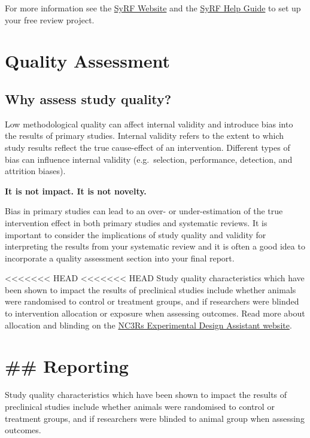 \documentclass[
]{book}
\begin{document}
For more information see the \href{http://syrf.org.uk/}{SyRF Website} and the \href{https://assets.syrf.org.uk/guides/SyRF_User_Guide.pdf}{SyRF Help Guide} to set up your free review project.

\hypertarget{quality-assessment}{%
\chapter{Quality Assessment}\label{quality-assessment}}

\hypertarget{why-assess-study-quality}{%
\section{Why assess study quality?}\label{why-assess-study-quality}}

Low methodological quality can affect internal validity and introduce bias into the results of primary studies. Internal validity refers to the extent to which study results reflect the true cause-effect of an intervention. Different types of bias can influence internal validity (e.g.~selection, performance, detection, and attrition biases).

\textbf{It is not impact. It is not novelty.}

Bias in primary studies can lead to an over- or under-estimation of the true intervention effect in both primary studies and systematic reviews. It is important to consider the implications of study quality and validity for interpreting the results from your systematic review and it is often a good idea to incorporate a quality assessment section into your final report.

\textless\textless\textless\textless\textless\textless\textless{} HEAD
\textless\textless\textless\textless\textless\textless\textless{} HEAD
Study quality characteristics which have been shown to impact the results of preclinical studies include whether animals were randomised to control or treatment groups, and if researchers were blinded to intervention allocation or exposure when assessing outcomes.
Read more about allocation and blinding on the \href{https://eda.nc3rs.org.uk/experimental-design-allocation}{NC3Rs Experimental Design Assistant website}.

\hypertarget{reporting}{%
\chapter{\#\# Reporting}\label{reporting}}

Study quality characteristics which have been shown to impact the results of preclinical studies include whether animals were randomised to control or treatment groups, and if researchers were blinded to animal group when assessing outcomes.
\end{document}
